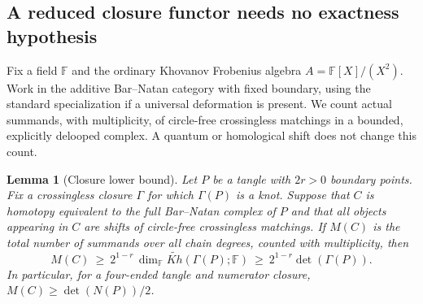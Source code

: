 \documentclass[11pt,a4paper]{article}
\newtheorem{lemma}[theorem]{Lemma}
\theoremstyle{definition}
\theoremstyle{remark}
\numberwithin{equation}{section}
\begin{document}
\subsection{A reduced closure functor needs no exactness hypothesis}

Fix a field $\mathbb F$ and the ordinary Khovanov Frobenius algebra
$A=\mathbb F[X]/(X^2)$.  Work in the additive Bar--Natan category with
fixed boundary, using the standard specialization if a universal
deformation is present.  We count actual summands, with multiplicity,
of circle-free crossingless matchings in a bounded, explicitly delooped
complex.  A quantum or homological shift does not change this count.

\begin{lemma}[Closure lower bound]
\label{lem:reduced-closure-size}
Let $P$ be a tangle with $2r>0$ boundary points.  Fix a crossingless
closure $\Gamma$ for which $\Gamma(P)$ is a knot.  Suppose that $C$ is
homotopy equivalent to the full Bar--Natan complex of $P$ and that all
objects appearing in $C$ are shifts of circle-free crossingless
matchings.  If $M(C)$ is the total number of summands over all chain
degrees, counted with multiplicity, then
\[
 M(C)\ \ge\ 2^{1-r}\,
 \dim_{\mathbb F}\widetilde{Kh}(\Gamma(P);\mathbb F)
 \ \ge\ 2^{1-r}\det(\Gamma(P)).
\]
In particular, for a four-ended tangle and numerator closure,
$M(C)\ge \det(N(P))/2$.
\end{lemma}
\end{document}
